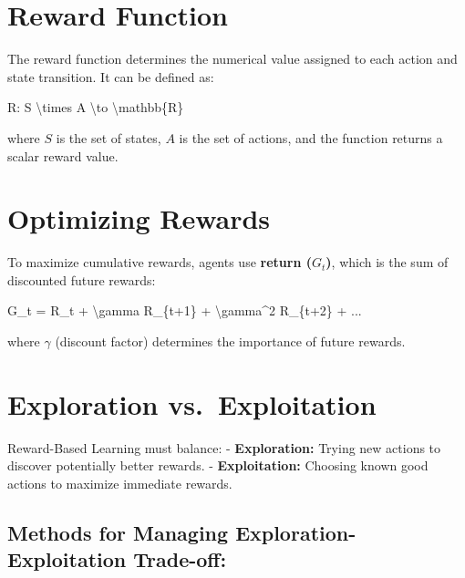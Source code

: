 \documentclass[
]{book}
\newenvironment{Shaded}{\begin{snugshade}}{\end{snugshade}}
\newcommand{\NormalTok}[1]{#1}
\begin{document}
\section{\texorpdfstring{\textbf{Reward Function}}{Reward Function}}\label{reward-function}

The reward function determines the numerical value assigned to each action and state transition. It can be defined as:

\begin{Shaded}
\begin{Highlighting}[]
\NormalTok{R: S \textbackslash{}times A \textbackslash{}to \textbackslash{}mathbb\{R\}}
\end{Highlighting}
\end{Shaded}

where \(S\) is the set of states, \(A\) is the set of actions, and the function returns a scalar reward value.

\section{\texorpdfstring{\textbf{Optimizing Rewards}}{Optimizing Rewards}}\label{optimizing-rewards}

To maximize cumulative rewards, agents use \textbf{return (\(G_t\))}, which is the sum of discounted future rewards:

\begin{Shaded}
\begin{Highlighting}[]
\NormalTok{G\_t = R\_t + \textbackslash{}gamma R\_\{t+1\} + \textbackslash{}gamma\^{}2 R\_\{t+2\} + ...}
\end{Highlighting}
\end{Shaded}

where \(\gamma\) (discount factor) determines the importance of future rewards.

\section{\texorpdfstring{\textbf{Exploration vs.~Exploitation}}{Exploration vs.~Exploitation}}\label{exploration-vs.-exploitation}

Reward-Based Learning must balance:
- \textbf{Exploration:} Trying new actions to discover potentially better rewards.
- \textbf{Exploitation:} Choosing known good actions to maximize immediate rewards.

\subsection{\texorpdfstring{\textbf{Methods for Managing Exploration-Exploitation Trade-off:}}{Methods for Managing Exploration-Exploitation Trade-off:}}\label{methods-for-managing-exploration-exploitation-trade-off}
\end{document}
